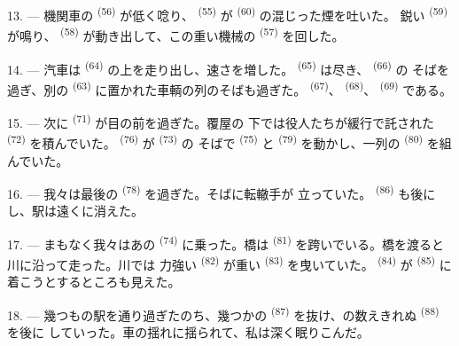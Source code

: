 13. --- 機関車の \textsuperscript{(56)} が低く唸り、
\textsuperscript{(55)} が \textsuperscript{(60)} の混じった煙を吐いた。
鋭い \textsuperscript{(59)} が鳴り、
\textsuperscript{(58)} が動き出して、この重い機械の \textsuperscript{(57)}
を回した。

\VUsaut{3.0mm}
\VUsaut{3.0mm}

14. --- 汽車は \textsuperscript{(64)} の上を走り出し、速さを増した。
 \textsuperscript{(65)} は尽き、 \textsuperscript{(66)} の
そばを過ぎ、別の \textsuperscript{(63)} に置かれた車輌の列のそばも過ぎた。
 \textsuperscript{(67)}、 \textsuperscript{(68)}、
 \textsuperscript{(69)} である。


15. --- 次に \textsuperscript{(71)} が目の前を過ぎた。覆屋の
下では役人たちが緩行で託された \textsuperscript{(72)} を積んでいた。
 \textsuperscript{(76)} が \textsuperscript{(73)} の
そばで \textsuperscript{(75)} と \textsuperscript{(79)}
を動かし、一列の \textsuperscript{(80)} を組んでいた。

16. --- 我々は最後の \textsuperscript{(78)} を過ぎた。そばに転轍手が
立っていた。 \textsuperscript{(86)} も後にし、駅は遠くに消えた。

17. --- まもなく我々はあの \textsuperscript{(74)} に乗った。橋は
 \textsuperscript{(81)} を跨いでいる。橋を渡ると川に沿って走った。川では
力強い \textsuperscript{(82)} が重い \textsuperscript{(83)}
を曳いていた。 \textsuperscript{(84)} が
\textsuperscript{(85)} に着こうとするところも見えた。

18. --- 幾つもの駅を通り過ぎたのち、幾つかの \textsuperscript{(87)}
を抜け、の数えきれぬ \textsuperscript{(88)} を後に
していった。車の揺れに揺られて、私は深く眠りこんだ。

\VUsaut{3.0mm}
\VUsaut{3.0mm}


